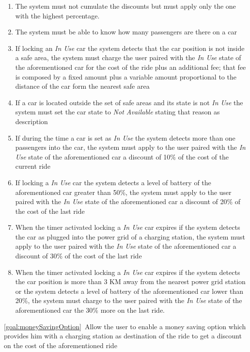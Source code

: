 \begin{description}
  			\begin{enumerate}[resume*]
  			    \item The system must not cumulate the discounts but must apply only the one with
  			    the highest percentage.
  			    \item The system must be able to know how many passengers are there on a car	
  				\item If locking an \emph{In Use} car the system detects that the car position is not
  				inside a safe area, the system must charge the user paired with the \emph{In Use}
  				state of the aforementioned car for the cost of the ride plus an additional fee; that fee
  				is composed by a fixed amount plus a variable amount proportional to the distance of
  				the car form the nearest safe area
  				\item If a car is located outside the set of safe areas and its state is not \emph{In
  				Use} the system must set the car state to \emph{Not Available} stating that reason
  				as description
  				\item If during the time a car is set as \emph{In Use} the system detects more than
  				one passengers into the car, the system must apply to the user paired with the
  				\emph{In Use} state of the aforementioned car a discount of 10\% of the cost of
  				the current ride
  				\item If locking  a \emph{In Use} car the system detects a level of battery of the
  				aforementioned car greater than 50\%, the system must apply to the user paired with
  				the \emph{In Use} state of the aforementioned car a discount of 20\% of the cost
  				of the last ride
  				\item When the timer activated locking a \emph{In Use} car expires if the system
  				detects the car as plugged into the power grid of a charging station, the system must
  				apply to the user paired with the \emph{In Use} state of the aforementioned car a
  				discount of 30\% of the cost of the last ride
  				\item When the timer activated locking a \emph{In Use} car expires if the system
  				detects the car position is more than 3 KM away from the nearest power grid station
  				or the system detects a level of battery of the aforementioned car lower than 20\%, 
  				the system must charge to the user paired with the \emph{In Use} state of the 
  				aforementioned car the 30\% more on the last ride. 
   			\end{enumerate}
  		\item \ref{goal:moneySavingOption}\ Allow the user to enable a money saving option which provides him with a charging station as destination of the ride to get a discount on the cost of the aforementioned ride

\end{description}
